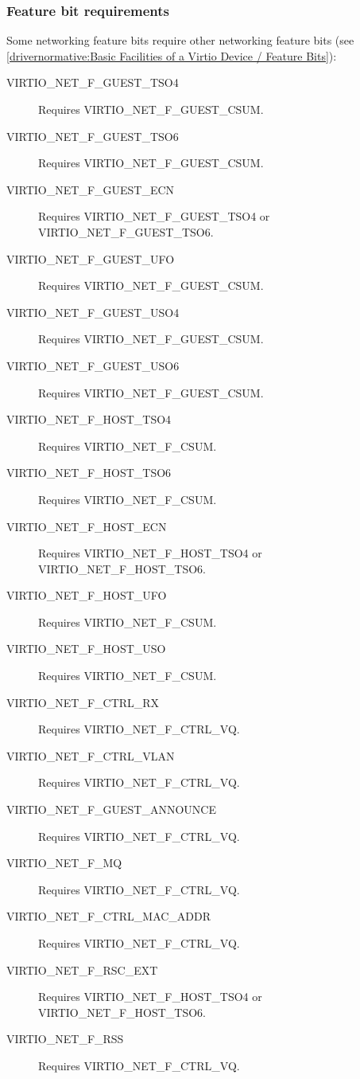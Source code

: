 \subsubsection{Feature bit requirements}\label{sec:Device Types / Network Device / Feature bits / Feature bit requirements}

Some networking feature bits require other networking feature bits
(see \ref{drivernormative:Basic Facilities of a Virtio Device / Feature Bits}):

\begin{description}
\item[VIRTIO_NET_F_GUEST_TSO4] Requires VIRTIO_NET_F_GUEST_CSUM.
\item[VIRTIO_NET_F_GUEST_TSO6] Requires VIRTIO_NET_F_GUEST_CSUM.
\item[VIRTIO_NET_F_GUEST_ECN] Requires VIRTIO_NET_F_GUEST_TSO4 or VIRTIO_NET_F_GUEST_TSO6.
\item[VIRTIO_NET_F_GUEST_UFO] Requires VIRTIO_NET_F_GUEST_CSUM.
\item[VIRTIO_NET_F_GUEST_USO4] Requires VIRTIO_NET_F_GUEST_CSUM.
\item[VIRTIO_NET_F_GUEST_USO6] Requires VIRTIO_NET_F_GUEST_CSUM.

\item[VIRTIO_NET_F_HOST_TSO4] Requires VIRTIO_NET_F_CSUM.
\item[VIRTIO_NET_F_HOST_TSO6] Requires VIRTIO_NET_F_CSUM.
\item[VIRTIO_NET_F_HOST_ECN] Requires VIRTIO_NET_F_HOST_TSO4 or VIRTIO_NET_F_HOST_TSO6.
\item[VIRTIO_NET_F_HOST_UFO] Requires VIRTIO_NET_F_CSUM.
\item[VIRTIO_NET_F_HOST_USO] Requires VIRTIO_NET_F_CSUM.

\item[VIRTIO_NET_F_CTRL_RX] Requires VIRTIO_NET_F_CTRL_VQ.
\item[VIRTIO_NET_F_CTRL_VLAN] Requires VIRTIO_NET_F_CTRL_VQ.
\item[VIRTIO_NET_F_GUEST_ANNOUNCE] Requires VIRTIO_NET_F_CTRL_VQ.
\item[VIRTIO_NET_F_MQ] Requires VIRTIO_NET_F_CTRL_VQ.
\item[VIRTIO_NET_F_CTRL_MAC_ADDR] Requires VIRTIO_NET_F_CTRL_VQ.
\item[VIRTIO_NET_F_RSC_EXT] Requires VIRTIO_NET_F_HOST_TSO4 or VIRTIO_NET_F_HOST_TSO6.
\item[VIRTIO_NET_F_RSS] Requires VIRTIO_NET_F_CTRL_VQ.
\end{description}

